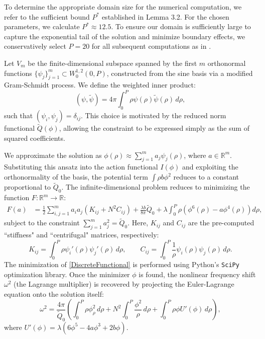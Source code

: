 \documentclass[12pt]{article}
\begin{document}
To determine the appropriate domain size for the numerical computation, we refer to the sufficient bound $P^*$ established in Lemma 3.2. For the chosen parameters, we calculate $P^* \approx 12.5$. To ensure our domain is sufficiently large to capture the exponential tail of the solution and minimize boundary effects, we conservatively select $P=20$ for all subsequent computations as in \cite{VW}.

Let $V_m$ be the finite-dimensional subspace spanned by the first $m$ orthonormal functions $\{\psi_j\}_{j=1}^m \subset W^{1,2}_0(0, P)$, constructed from the sine basis via a modified Gram-Schmidt process. We define the weighted inner product:
\begin{equation}
    (\psi, \tilde{\psi}) = 4\pi \int_0^P \rho \psi(\rho) \tilde{\psi}(\rho) \, d\rho,
\end{equation}
such that $(\psi_i, \psi_j) = \delta_{ij}$. This choice is motivated by the reduced norm functional $\tilde{Q}(\phi)$, allowing the constraint to be expressed simply as the sum of squared coefficients.

We approximate the solution as $\phi(\rho) \approx \sum_{j=1}^{m} a_j \psi_j(\rho)$, where $a \in \mathbb{R}^m$. Substituting this ansatz into the action functional $I(\phi)$ and exploiting the orthonormality of the basis, the potential term $\int \rho b \phi^2$ reduces to a constant proportional to $\tilde{Q}_0$. The infinite-dimensional problem reduces to minimizing the function $F: \mathbb{R}^m \to \mathbb{R}$:
\begin{align}
    F(a) &= \frac{1}{2} \sum_{i,j=1}^m a_i a_j \left( K_{ij} + N^2 C_{ij} \right) + \frac{\lambda b}{8\pi}\tilde{Q}_0 + \lambda \int_0^P \rho \left( \phi^6(\rho) - a\phi^4(\rho) \right) d\rho,
    \label{DiscreteFunctional}
\end{align}
subject to the constraint $\sum_{j=1}^m a_j^2 = \tilde{Q}_0$. Here, $K_{ij}$ and $C_{ij}$ are the pre-computed ``stiffness" and ``centrifugal" matrices, respectively:
\begin{equation}
    K_{ij} = \int_0^P \rho \psi_i'(\rho) \psi_j'(\rho) \, d\rho, \qquad C_{ij} = \int_0^P \frac{1}{\rho} \psi_i(\rho) \psi_j(\rho) \, d\rho.
\end{equation}
The minimization of \eqref{DiscreteFunctional} is performed using Python's \texttt{SciPy} optimization library. Once the minimizer $\phi$ is found, the nonlinear frequency shift $\omega^2$ (the Lagrange multiplier) is recovered by projecting the Euler-Lagrange equation onto the solution itself:
\begin{equation}
    \omega^2 = \frac{4\pi}{\tilde{Q}_0} \left( \int_0^P \rho \phi_\rho^2 \, d\rho + N^2 \int_0^P \frac{\phi^2}{\rho} \, d\rho + \int_0^P \rho \phi U'(\phi) \, d\rho \right),
    \label{OmegaEq}
\end{equation}
where $U'(\phi) = \lambda(6\phi^5 - 4a\phi^3 + 2b\phi)$.
\end{document}
